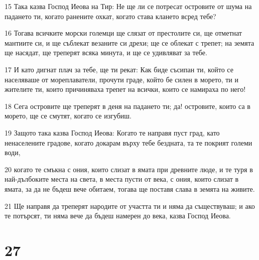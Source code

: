 \par 15 Така казва Господ Иеова на Тир: Не ще ли се потресат островите от шума на падането ти, когато ранените охкат, когато става клането всред тебе?
\par 16 Тогава всичките морски големци ще слязат от престолите си, ще отметнат мантиите си, и ще съблекат везаните си дрехи; ще се облекат с трепет; на земята ще насядат, ще треперят всяка минута, и ще се удивляват за тебе.
\par 17 И като дигнат плач за тебе, ще ти рекат: Как биде съсипан ти, който се населяваше от мореплаватели, прочути граде, който бе силен в морето, ти и жителите ти, които причиняваха трепет на всички, които се намираха по него!
\par 18 Сега островите ще треперят в деня на падането ти; да! островите, които са в морето, ще се смутят, когато се изгубиш.
\par 19 Защото така казва Господ Иеова: Когато те направя пуст град, като ненаселените градове, когато докарам върху тебе бездната, та те покрият големи води,
\par 20 когато те смъкна с ония, които слизат в ямата при древните люде, и те туря в най-дълбоките места на света, в места пусти от века, с ония, които слизат в ямата, за да не бъдеш вече обитаем, тогава ще поставя слава в земята на живите.
\par 21 Ще направя да треперят народите от участта ти и няма да съществуваш; и ако те потърсят, ти няма вече да бъдеш намерен до века, казва Господ Иеова.

\chapter{27}

